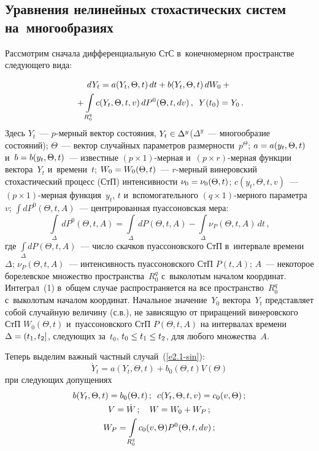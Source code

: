 \begin{multicols}{2}
\vspace*{-15pt}


\section{Уравнения нелинейных стохастических систем на~многообразиях}

\vspace*{-6pt}

Рассмотрим сначала дифференциальную  СтС в~конечномерном пространстве следующего вида:

\noindent
    \begin{multline}
    dY_t= a (Y_t,\Theta,t)\, dt + b(Y_t,\Theta,t)\, d W_0 + {}\\
    {}+
    \int\limits_{R_0^q} c(Y_t,\Theta,t,v) \,dP^0 (\Theta, t,
    dv)\,,\enskip Y(t_0)=Y_0\,.\label{e2.1-sin}
    \end{multline}
Здесь $Y_t$~--- $p$-мер\-ный вектор состояния, $Y_t\hm\in \Delta^y$\linebreak ($\Delta^y$~--- 
многообразие состояний); $\Theta$~--- вектор  случайных параметров размерности~$p^\Theta$;
$a\hm=a (y_t,\Theta,t)$ и~$b\hm= b(y_t,\Theta,t)$~--- известные $(p\times 1)$-мер\-ная 
и~$(p\times r)$-мер\-ная функции вектора~$Y_t$ и~времени~$t$; $W_0\hm= W_0(\Theta, t)$~---
$r$-мер\-ный винеровский стохастический процесс (СтП) интенсивности $\nu_0\hm=
\nu_0(\Theta,t)$; $c(y_t,\Theta, t,v)$~--- $(p\times 1)$-мер\-ная функция~$y_t$, 
$t$ и~вспомогательного
$(q\times 1)$-мер\-но\-го парамет\-ра~$v$; $\int\limits d P^0 (\Theta, t,A)$~--- 
центрированная пуассоновская мера:
    $$
    \int\limits_{\Delta}\, dP^0 (\Theta, t,A)= 
    \int\limits_{\Delta} \,dP (\Theta, t,A)-
    \int\limits_{\Delta} \nu_P (\Theta, t,A)\, dt\,,
    $$
где $\int\limits_{\Delta} d P (\Theta, t,A)$~--- число скачков пуассоновского
СтП в~интервале времени~$\Delta$; $\nu_P (\Theta, t,A)$~--- интенсивность
пуассоновского СтП $P(t,A)$;
$A$~--- некоторое борелевское множество пространства~$R^q_0$ 
с~выколотым началом координат.
Интеграл~(1) в~общем случае распространяется на все пространство~$R_0^q$ 
с~выколотым началом координат.
Начальное значение~$Y_0$ вектора~$Y_t$ представляет
собой случайную величину (с.в.), не зависящую от приращений винеровского
СтП $W_0(\Theta, t)$ и~пуассоновского СтП $P(\Theta, t,A)$ на интервалах
времени $\Delta\hm= (t_1, t_2]$, следующих за~$t_0$, $t_0\hm\le t_1\hm\le t_2$,
для любого множества~$A$.

Теперь выделим важный частный случай~(\ref{e2.1-sin}):
    \begin{equation}
    \dot Y_t = a (Y_t,\Theta, t)+ b_0 (\Theta,t) V(\Theta)
    \label{e2.2-sin}
    \end{equation}
при следующих допущениях
\begin{gather*}
    b(Y_t,\Theta, t)= b_0 (\Theta, t)\,;\enskip c(Y_t,\Theta, t,v) = c_0(v,\Theta)\,;
\\
V=\dot W\,;\quad W = W_0 + W_P\,;\\
W_P = \int\limits\limits_{R_0^q} c_0 (v,\Theta) 
P^0(\Theta, t, dv)\,;
\end{gather*}


\end{multicols}
